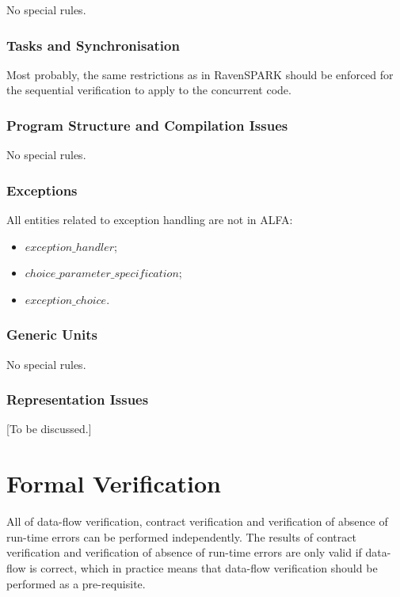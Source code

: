 \documentclass{article}
\newcommand{\bnf}[1]{$\mathit{#1}$}
\begin{document}
No special rules.

\subsubsection{Tasks and Synchronisation}

Most probably, the same restrictions as in RavenSPARK should be enforced for
the sequential verification to apply to the concurrent code.

\subsubsection{Program Structure and Compilation Issues}

No special rules.

\subsubsection{Exceptions}

All entities related to exception handling are not in ALFA:
\begin{itemize}
\item \bnf{exception\_handler};
\item \bnf{choice\_parameter\_specification};
\item \bnf{exception\_choice}.
\end{itemize}

\subsubsection{Generic Units}

No special rules.

\subsubsection{Representation Issues}

[To be discussed.]

\section{Formal Verification}

All of data-flow verification, contract verification and verification of
absence of run-time errors can be performed independently. The results of
contract verification and verification of absence of run-time errors are only
valid if data-flow is correct, which in practice means that data-flow
verification should be performed as a pre-requisite.
\end{document}
